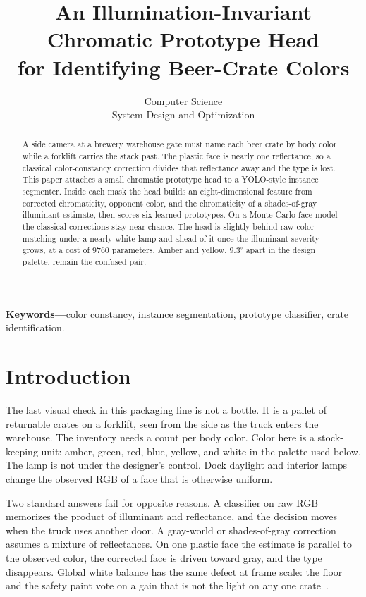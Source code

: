 \documentclass[10pt]{article}
\title{An Illumination-Invariant Chromatic Prototype Head\\ for Identifying Beer-Crate Colors}
\author{Computer Science\\ System Design and Optimization}
\date{}
\begin{document}
\maketitle

\begin{abstract}
A side camera at a brewery warehouse gate must name each beer crate by body color while a forklift carries the stack past. The plastic face is nearly one reflectance, so a classical color-constancy correction divides that reflectance away and the type is lost. This paper attaches a small chromatic prototype head to a YOLO-style instance segmenter. Inside each mask the head builds an eight-dimensional feature from corrected chromaticity, opponent color, and the chromaticity of a shades-of-gray illuminant estimate, then scores six learned prototypes. On a Monte Carlo face model the classical corrections stay near chance. The head is slightly behind raw color matching under a nearly white lamp and ahead of it once the illuminant severity grows, at a cost of $9760$ parameters. Amber and yellow, $9.3^{\circ}$ apart in the design palette, remain the confused pair.
\end{abstract}

\noindent\textbf{Keywords---}color constancy, instance segmentation, prototype classifier, crate identification.

\section{Introduction}
The last visual check in this packaging line is not a bottle. It is a pallet of returnable crates on a forklift, seen from the side as the truck enters the warehouse. The inventory needs a count per body color. Color here is a stock-keeping unit: amber, green, red, blue, yellow, and white in the palette used below. The lamp is not under the designer's control. Dock daylight and interior lamps change the observed RGB of a face that is otherwise uniform.

Two standard answers fail for opposite reasons. A classifier on raw RGB memorizes the product of illuminant and reflectance, and the decision moves when the truck uses another door. A gray-world or shades-of-gray correction~\cite{buchsbaum1980,finlayson2004} assumes a mixture of reflectances. On one plastic face the estimate is parallel to the observed color, the corrected face is driven toward gray, and the type disappears. Global white balance has the same defect at frame scale: the floor and the safety paint vote on a gain that is not the light on any one crate~\cite{gijsenij2011,afifi2019}.
\end{document}
